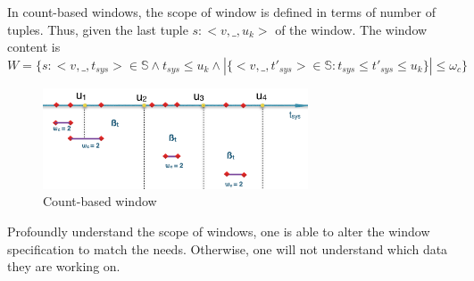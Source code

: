 In count-based windows, the scope of window is defined in terms of number of tuples. Thus, given the last tuple $s:<v, \_, u_k>$ of the window. The window content is 
$W=\{s:<v, \_, t_{sys}> \in \mathbb{S} \wedge t_{sys} \leq u_k \wedge  |\{<v,\_,t'_{sys}> \in \mathbb{S} : t_{sys} \leq t'_{sys} \leq u_k\}| \leq \omega_c \}$

\begin{figure}[htbp!] 
\centering    
\includegraphics[width=0.7\textwidth]{countbased_window}
\caption{Count-based window}
\label{fig:countbased_window}
\end{figure}

Profoundly understand the scope of windows, one is able to alter the window specification to match the needs. Otherwise, one will not understand which data they are working on.


